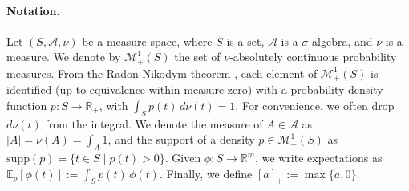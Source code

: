 \documentclass{article}
\begin{document}
\begin{comment}
Summing up, the main contributions of this paper are:
\begin{itemize}[nosep]
    \item We extend sparsemax, regularized prediction maps, and FY losses to arbitrary (possibly continuous) densities.
    \item We present $\alpha$-sparse families. For $\alpha>1$, the densities in these families have varying, sparse supports. Some new distributions are constructed, namely the \textit{truncated parabola} (2-sparse counterpart of the Gaussian).
    \item We develop new attention mechanisms for continuous domains, revealing a connection between their Jacobian and generalized covariances. We use it to obtain an efficient backpropagation algorithm, applying it to document classification and machine translation tasks.
    \item We show that properties of FY losses hold for general $\alpha$-sparse families, including convexity and closed-form gradient w.r.t.\ their canonical parameters. We use this to perform interval regression, which returns mean estimates and intervals, based on the support of their distribution.
\end{itemize}
\end{comment}

\paragraph{Notation.}
Let $(S, \mathcal{A}, \nu)$ be a measure space, 
where $S$ is a set, $\mathcal{A}$ is a $\sigma$-algebra, and $\nu$ is a measure. 
We denote by $\mathcal{M}_+^1(S)$ the set of $\nu$-absolutely continuous probability measures. From the Radon-Nikodym theorem \citep[\S31]{halmos2013measure}, each element of $\mathcal{M}_+^1(S)$ is identified (up to equivalence within measure zero) with a probability density function $p: S \rightarrow \mathbb{R}_+$, with $\int_S p(t)\, d\nu(t) = 1$. 
For convenience, we often drop $d\nu(t)$ from the integral. We denote the measure of $A\in  \mathcal{A}$ as
$|A| = \nu(A) = \int_{A} 1$, and  
the support of a density $p \in \mathcal{M}_+^1(S)$ as $\mathrm{supp}(p) = \{t \in S \mid p(t) > 0\}$. 
Given $\phi:S \rightarrow \mathbb{R}^m$, we write expectations 
as
$\mathbb{E}_p[\phi(t)] := \int_S p(t) \, \phi(t)$.  Finally, we define $[a]_+ := \max\{a, 0\}$. 
\end{document}
